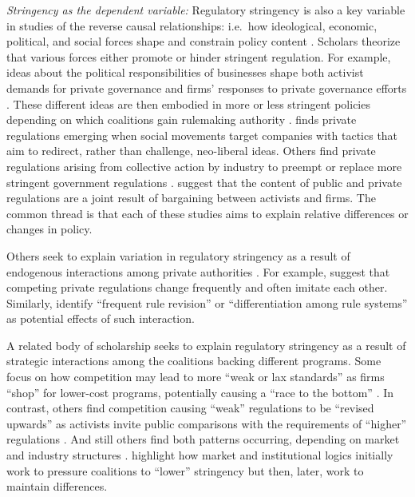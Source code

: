 \documentclass[
      12pt,
            Review ]{article}
\begin{document}
\emph{Stringency as the dependent variable:} Regulatory stringency is
also a key variable in studies of the reverse causal relationships:
i.e.~how ideological, economic, political, and social forces shape and
constrain policy content \citep{Bartley2003, Cashore2004, Fischer2014}.
Scholars theorize that various forces either promote or hinder stringent
regulation. For example, ideas about the political responsibilities of
businesses shape both activist demands for private governance and firms'
responses to private governance efforts \citep{Bartley2003, Djelic2017}.
These different ideas are then embodied in more or less stringent
policies depending on which coalitions gain rulemaking authority
\citep{Botzem2012, Hsueh2012}. \citet{Bartley2003} finds private
regulations emerging when social movements target companies with tactics
that aim to redirect, rather than challenge, neo-liberal ideas. Others
find private regulations arising from collective action by industry to
preempt or replace more stringent government regulations
\citep{Bartley2007, Cashore2002, Grabosky2013, Green2013, Loconto2014, Lyon2008, Maxwell2000, Prakash2000}.
\citet{Abbott2009} suggest that the content of public and private
regulations are a joint result of bargaining between activists and
firms. The common thread is that each of these studies aims to explain
relative differences or changes in policy.

Others seek to explain variation in regulatory stringency as a result of
endogenous interactions among private authorities
\citep{DeLeon2009, Eberlein2014, Green2017, Gulbrandsen2014, Howard-Grenville2008, Li2015, Mills2016d}.
For example, \citet{Smith2010} suggest that competing private
regulations change frequently and often imitate each other. Similarly,
\citet{Eberlein2014} identify ``frequent rule revision'' or
``differentiation among rule systems'' as potential effects of such
interaction.

A related body of scholarship seeks to explain regulatory stringency as
a result of strategic interactions among the coalitions backing
different programs. Some focus on how competition may lead to more
``weak or lax standards'' as firms ``shop'' for lower-cost programs,
potentially causing a ``race to the bottom''
\citep{Abbott2010, Fransen2011, Gulbrandsen2004}. In contrast, others
find competition causing ``weak'' regulations to be ``revised upwards''
as activists invite public comparisons with the requirements of
``higher'' regulations \citep{Overdevest2005, Overdevest2010}. And still
others find both patterns occurring, depending on market and industry
structures \citep{Cashore2004, Hassel2008, VanderVen2015}.
\citet{Cashore2004} highlight how market and institutional logics
initially work to pressure coalitions to ``lower'' stringency but then,
later, work to maintain differences.
\end{document}
